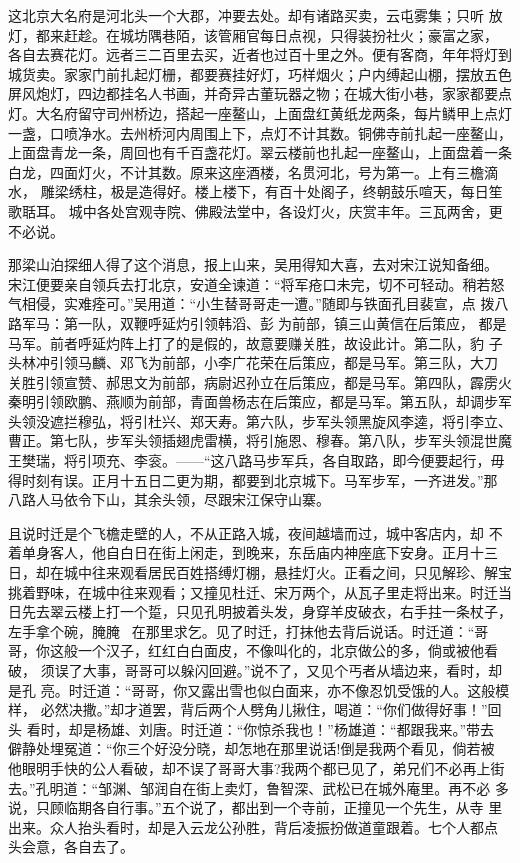 这北京大名府是河北头一个大郡，冲要去处。却有诸路买卖，云屯雾集；只听
放灯，都来赶趁。在城坊隅巷陌，该管厢官每日点视，只得装扮社火；豪富之家，
各自去赛花灯。远者三二百里去买，近者也过百十里之外。便有客商，年年将灯到
城货卖。家家门前扎起灯栅，都要赛挂好灯，巧样烟火；户内缚起山棚，摆放五色
屏风炮灯，四边都挂名人书画，并奇异古董玩器之物；在城大街小巷，家家都要点
灯。大名府留守司州桥边，搭起一座鳌山，上面盘红黄纸龙两条，每片鳞甲上点灯
一盏，口喷净水。去州桥河内周围上下，点灯不计其数。铜佛寺前扎起一座鳌山，
上面盘青龙一条，周回也有千百盏花灯。翠云楼前也扎起一座鳌山，上面盘着一条
白龙，四面灯火，不计其数。原来这座酒楼，名贯河北，号为第一。上有三檐滴水，
雕梁绣柱，极是造得好。楼上楼下，有百十处阁子，终朝鼓乐喧天，每日笙歌聒耳。
城中各处宫观寺院、佛殿法堂中，各设灯火，庆赏丰年。三瓦两舍，更不必说。

那梁山泊探细人得了这个消息，报上山来，吴用得知大喜，去对宋江说知备细。
宋江便要亲自领兵去打北京，安道全谏道：“将军疮口未完，切不可轻动。稍若怒
气相侵，实难痊可。”吴用道：“小生替哥哥走一遭。”随即与铁面孔目裴宣，点
拨八路军马：第一队，双鞭呼延灼引领韩滔、彭为前部，镇三山黄信在后策应，
都是马军。前者呼延灼阵上打了的是假的，故意要赚关胜，故设此计。第二队，豹
子头林冲引领马麟、邓飞为前部，小李广花荣在后策应，都是马军。第三队，大刀
关胜引领宣赞、郝思文为前部，病尉迟孙立在后策应，都是马军。第四队，霹雳火
秦明引领欧鹏、燕顺为前部，青面兽杨志在后策应，都是马军。第五队，却调步军
头领没遮拦穆弘，将引杜兴、郑天寿。第六队，步军头领黑旋风李逵，将引李立、
曹正。第七队，步军头领插翅虎雷横，将引施恩、穆春。第八队，步军头领混世魔
王樊瑞，将引项充、李衮。——“这八路马步军兵，各自取路，即今便要起行，毋
得时刻有误。正月十五日二更为期，都要到北京城下。马军步军，一齐进发。”那
八路人马依令下山，其余头领，尽跟宋江保守山寨。

且说时迁是个飞檐走壁的人，不从正路入城，夜间越墙而过，城中客店内，却
不着单身客人，他自白日在街上闲走，到晚来，东岳庙内神座底下安身。正月十三
日，却在城中往来观看居民百姓搭缚灯棚，悬挂灯火。正看之间，只见解珍、解宝
挑着野味，在城中往来观看；又撞见杜迁、宋万两个，从瓦子里走将出来。时迁当
日先去翠云楼上打一个踅，只见孔明披着头发，身穿羊皮破衣，右手拄一条杖子，
左手拿个碗，腌腌，在那里求乞。见了时迁，打抹他去背后说话。时迁道：“哥
哥，你这般一个汉子，红红白白面皮，不像叫化的，北京做公的多，倘或被他看破，
须误了大事，哥哥可以躲闪回避。”说不了，又见个丐者从墙边来，看时，却是孔
亮。时迁道：“哥哥，你又露出雪也似白面来，亦不像忍饥受饿的人。这般模样，
必然决撒。”却才道罢，背后两个人劈角儿揪住，喝道：“你们做得好事！”回头
看时，却是杨雄、刘唐。时迁道：“你惊杀我也！”杨雄道：“都跟我来。”带去
僻静处埋冤道：“你三个好没分晓，却怎地在那里说话!倒是我两个看见，倘若被
他眼明手快的公人看破，却不误了哥哥大事?我两个都已见了，弟兄们不必再上街
去。”孔明道：“邹渊、邹润自在街上卖灯，鲁智深、武松已在城外庵里。再不必
多说，只顾临期各自行事。”五个说了，都出到一个寺前，正撞见一个先生，从寺
里出来。众人抬头看时，却是入云龙公孙胜，背后凌振扮做道童跟着。七个人都点
头会意，各自去了。

